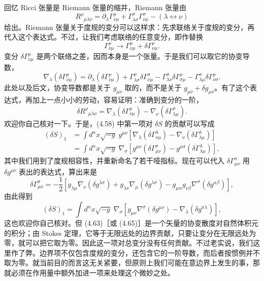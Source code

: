 回忆 Ricci 张量是 Riemann 张量的缩并，Riemann 张量由
\begin{equation*}
R^\rho{}_{\mu\lambda\nu} = \partial_\lambda\Gamma^\rho_{\nu\mu} + \Gamma^\rho_{\lambda\sigma}\Gamma^\sigma_{\nu\mu} - (\lambda\leftrightarrow\nu)
\tag{4.59}
\end{equation*}
给出。Riemann 张量关于度规的变分可以这样求：先求联络关于度规的变分，再代入这个表达式。不过，让我们考虑联络的任意变分，即作替换
\begin{equation*}
\Gamma^\rho_{\nu\mu} \rightarrow \Gamma^\rho_{\nu\mu} + \delta\Gamma^\rho_{\nu\mu}.
\tag{4.60}
\end{equation*}
变分 $\delta\Gamma^\rho_{\nu\mu}$ 是两个联络之差，因而本身是一个张量。于是我们可以取它的协变导数，
\begin{equation*}
\nabla_\lambda(\delta\Gamma^\rho_{\nu\mu}) = \partial_\lambda(\delta\Gamma^\rho_{\nu\mu}) + \Gamma^\rho_{\lambda\sigma}\delta\Gamma^\sigma_{\nu\mu} - \Gamma^\sigma_{\lambda\nu}\delta\Gamma^\rho_{\sigma\mu} - \Gamma^\sigma_{\lambda\mu}\delta\Gamma^\rho_{\nu\sigma}.
\tag{4.61}
\end{equation*}
此处以及后文，协变导数都是关于 $g_{\mu\nu}$ 取的，而不是关于 $g_{\mu\nu}+\delta g_{\mu\nu}$。有了这个表达式，再加上一点小小的劳动，容易证明：准确到变分的一阶，
\begin{equation*}
\delta R^\rho{}_{\mu\lambda\nu} = \nabla_\lambda(\delta\Gamma^\rho_{\nu\mu}) - \nabla_\nu(\delta\Gamma^\rho_{\lambda\mu}).
\tag{4.62}
\end{equation*}
欢迎你自己核对一下。于是，(4.58) 中第一项对 $\delta S$ 的贡献可以写成
\begin{align*}
(\delta S)_1 &= \int d^nx\sqrt{-g}\; g^{\mu\nu}\left[\nabla_\lambda(\delta\Gamma^\lambda_{\nu\mu}) - \nabla_\nu(\delta\Gamma^\lambda_{\lambda\mu})\right] \\
&= \int d^nx\sqrt{-g}\; \nabla_\sigma\left[g^{\mu\nu}(\delta\Gamma^\sigma_{\mu\nu}) - g^{\mu\sigma}(\delta\Gamma^\lambda_{\lambda\mu})\right],
\tag{4.63}
\end{align*}
其中我们用到了度规相容性，并重新命名了若干哑指标。现在可以代入 $\delta\Gamma^\sigma_{\mu\nu}$ 用 $\delta g^{\mu\nu}$ 表出的表达式，算出来是
\begin{equation*}
\delta\Gamma^\sigma_{\mu\nu} = -\frac{1}{2}\left[g_{\lambda\mu}\nabla_\nu(\delta g^{\lambda\sigma}) + g_{\lambda\nu}\nabla_\mu(\delta g^{\lambda\sigma}) - g_{\mu\alpha}g_{\nu\beta}\nabla^\sigma(\delta g^{\alpha\beta})\right],
\tag{4.64}
\end{equation*}
由此得到
\begin{equation*}
(\delta S)_1 = \int d^nx\sqrt{-g}\; \nabla_\sigma\left[g_{\mu\nu}\nabla^\sigma(\delta g^{\mu\nu}) - \nabla_\lambda(\delta g^{\sigma\lambda})\right],
\tag{4.65}
\end{equation*}
这也欢迎你自己核对。但 (4.63)［或 (4.65)］是一个矢量的协变散度对自然体积元的积分；由 Stokes 定理，它等于无限远处的边界贡献，只要让变分在无限远处为零，就可以把它取为零。因此这一项对总变分没有任何贡献。不过老实说，我们这里作了弊。边界项不仅包含度规的变分，还包含它的一阶导数，而后者按惯例并不取为零。就当前目的而言这无关紧要，但原则上我们可能在意边界上发生的事，那就必须在作用量中额外加进一项来处理这个微妙之处。

